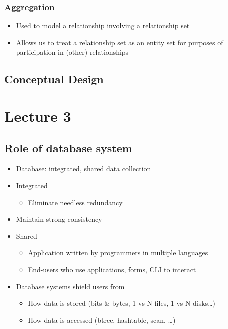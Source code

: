\documentclass[11pt]{article}
\begin{document}
\subsubsection{Aggregation}
\label{sec:org4795cf9}
\begin{itemize}
\item Used to model a relationship involving a relationship set
\item Allows us to treat a relationship set as an entity set for purposes of
participation in (other) relationships
\end{itemize}
\subsection{Conceptual Design}
\label{sec:orgfdb282a}
\section{Lecture 3}
\label{sec:orga6241d7}
\subsection{Role of database system}
\label{sec:org4fe8c9b}
\begin{itemize}
\item Database: integrated, shared data collection
\item Integrated
\begin{itemize}
\item Eliminate needless redundancy
\end{itemize}
\item Maintain strong consistency
\item Shared
\begin{itemize}
\item Application written by programmers in multiple languages
\item End-users who use applications, forms, CLI to interact
\end{itemize}
\item Database systems shield users from
\begin{itemize}
\item How data is stored (bits \& bytes, 1 vs N files, 1 vs N disks\ldots{})
\item How data is accessed (btree, hashtable, scan, \ldots{})
\end{itemize}
\end{itemize}
\end{document}
